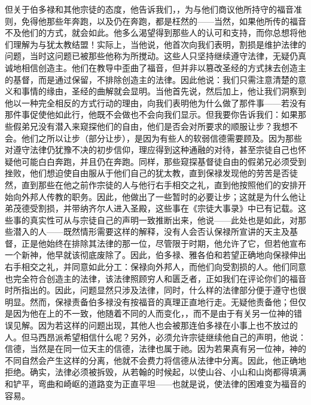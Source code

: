 但关于伯多禄和其他宗徒的态度，他告诉我们，，为与他们商议他所持守的福音准则，免得他那些年奔跑，以及仍在奔跑，都是枉然的——当然，如果他所传的福音不及他们的方式，就会如此。他多么渴望得到那些人的认可和支持，而你总想将他们理解为与犹太教结盟！实际上，当他说，他首次向我们表明，割损是维护法律的问题，当时这问题已被那些他称为所搅动。这些人只坚持继续遵守法律，无疑仍真诚地相信创造主。他们在教导中歪曲了福音，但并非以篡改圣经的方式抹去创造主的基督，而是通过保留，不排除创造主的法律。因此他说：我们只需注意清楚的意义和事情的缘由，圣经的曲解就会显明。当他首先说，然后加上，他让我们洞察到他以一种完全相反的方式行动的理由，向我们表明他为什么做了那件事——若没有那件事促使他如此行，他既不会做也不会向我们显示。但我要你告诉我们：如果那些假弟兄没有潜入来窥探他们的自由，他们是否会对所要求的顺服让步？我想不会。他们之所以让步（部分让步），是因为有些人的软弱信德需要顾及。因为那些对遵守法律仍犹豫不决的初步信仰，理应得到这种通融的对待，甚至宗徒自己也怀疑他可能白白奔跑，并且仍在奔跑。同样，那些窥探基督徒自由的假弟兄必须受到挫败，他们想迫使自由服从于他们自己的犹太教，直到保禄发现他的劳苦是否徒然，直到那些在他之前作宗徒的人与他行右手相交之礼，直到他按照他们的安排开始向外邦人传教的职务。因此，他做出了一些暂时的必要让步；这就是为什么他让弟茂德受割损，并带纳齐尔人进入圣殿，这些事在《宗徒大事录》中已有记载。这些事的真实性可从与宗徒自己的声明一致推断出来，他说——此处也是如此，对那些潜入的人——既然情形需要这样的解释，没有人会否认保禄所宣讲的天主及基督，正是他始终在排除其法律的那一位，尽管限于时期，他允许了它，但若他宣布一个新神，他早就该彻底废除了。因此，伯多禄、雅各伯和若望正确地向保禄伸出右手相交之礼，并同意如此分工：保禄向外邦人，而他们向受割损的人。他们同意也完全符合创造主的法律，该法律照顾穷人和匮乏者，正如我们在评论你们的福音时所指出的。因此，问题显然只涉及法律，同时，什么样的法律部分便于遵守也很明显。然而，保禄责备伯多禄没有按福音的真理正直地行走。无疑他责备他；但仅是因为他在上的不一致，他随着不同的人而变化，，而不是由于有关另一位神的错误见解。因为若这样的问题出现，其他人也会被那连伯多禄在小事上也不放过的人。但马西昂派希望相信什么呢？另外，必须允许宗徒继续他自己的声明，他说：信德，当然是在同一位天主的信德，法律也属于祂。因为若果真有另一位神，神的不同自然会产生这样的分离，他就不会费力将信德从法律中分离。因此，他正确地拒绝。确实，法律必须被拆毁，从若翰的时候起，以使山谷、小山和山岗都得填满和铲平，弯曲和崎岖的道路变为正直平坦——也就是说，使法律的困难变为福音的容易。\par

